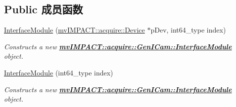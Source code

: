 \subsection*{Public 成员函数}
\begin{DoxyCompactItemize}
\item 
\hyperlink{classmv_i_m_p_a_c_t_1_1acquire_1_1_gen_i_cam_1_1_interface_module_a2939c8a2d9adedceb650168ace3fcab5}{Interface\+Module} (\hyperlink{classmv_i_m_p_a_c_t_1_1acquire_1_1_device}{mv\+I\+M\+P\+A\+C\+T\+::acquire\+::\+Device} $\ast$p\+Dev, int64\+\_\+type index)
\begin{DoxyCompactList}\small\item\em Constructs a new {\bfseries \hyperlink{classmv_i_m_p_a_c_t_1_1acquire_1_1_gen_i_cam_1_1_interface_module}{mv\+I\+M\+P\+A\+C\+T\+::acquire\+::\+Gen\+I\+Cam\+::\+Interface\+Module}} object. \end{DoxyCompactList}\item 
\hyperlink{classmv_i_m_p_a_c_t_1_1acquire_1_1_gen_i_cam_1_1_interface_module_a1d86a96f413173c7f0298b45bbaef6da}{Interface\+Module} (int64\+\_\+type index)
\begin{DoxyCompactList}\small\item\em Constructs a new {\bfseries \hyperlink{classmv_i_m_p_a_c_t_1_1acquire_1_1_gen_i_cam_1_1_interface_module}{mv\+I\+M\+P\+A\+C\+T\+::acquire\+::\+Gen\+I\+Cam\+::\+Interface\+Module}} object. \end{DoxyCompactList}\end{DoxyCompactItemize}
